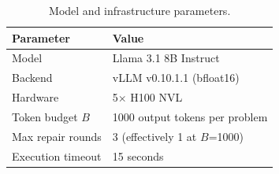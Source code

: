 \begin{table}[h]
\centering
\caption{Model and infrastructure parameters.}
\label{tab:infra}
\begin{tabular}{ll}
\toprule
\textbf{Parameter} & \textbf{Value} \\
\midrule
Model & Llama 3.1 8B Instruct \\
Backend & vLLM v0.10.1.1 (bfloat16) \\
Hardware & 5$\times$ H100 NVL \\
Token budget $B$ & 1000 output tokens per problem \\
Max repair rounds & 3 (effectively 1 at $B$=1000) \\
Execution timeout & 15 seconds \\
\bottomrule
\end{tabular}
\end{table}
